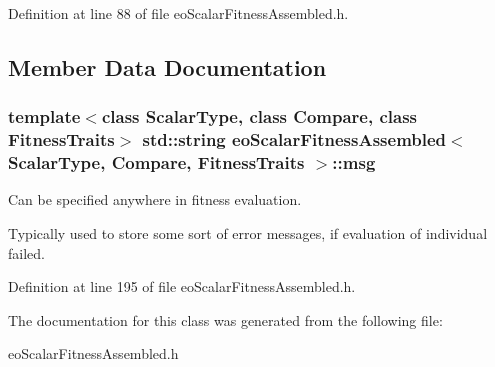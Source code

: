 Definition at line 88 of file eo\-Scalar\-Fitness\-Assembled.h.

\subsection{Member Data Documentation}
\subsubsection{\setlength{\rightskip}{0pt plus 5cm}template$<$class Scalar\-Type, class Compare, class Fitness\-Traits$>$ std::string {\bf eo\-Scalar\-Fitness\-Assembled}$<$ Scalar\-Type, Compare, Fitness\-Traits $>$::{\bf msg}}\label{classeo_scalar_fitness_assembled_o2}


Can be specified anywhere in fitness evaluation. 

Typically used to store some sort of error messages, if evaluation of individual failed. 

Definition at line 195 of file eo\-Scalar\-Fitness\-Assembled.h.

The documentation for this class was generated from the following file:\begin{CompactItemize}
\item 
eo\-Scalar\-Fitness\-Assembled.h\end{CompactItemize}

